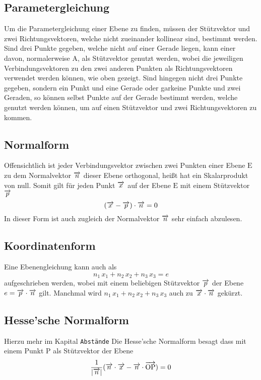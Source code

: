 \documentclass{article}
\begin{document}
\subsection{Parametergleichung}
Um die Parametergleichung einer Ebene zu finden, müssen der Stützvektor und zwei Richtungsvektoren, welche nicht zueinander kollinear sind, bestimmt werden. Sind drei Punkte gegeben, welche nicht auf einer Gerade liegen, kann einer davon, normalerweise $\mathrm{A}$, als Stützvektor genutzt werden, wobei die jeweiligen Verbindungsvektoren zu den zwei anderen Punkten als Richtungsvektoren verwendet werden können, wie oben gezeigt. \newline
Sind hingegen nicht drei Punkte gegeben, sondern ein Punkt und eine Gerade oder garkeine Punkte und zwei Geraden, so können selbst Punkte auf der Gerade bestimmt werden, welche genutzt werden können, um auf einen Stützvektor und zwei Richtungsvektoren zu kommen.
 
\subsection{Normalform}
Offensichtlich ist jeder Verbindungsvektor zwischen zwei Punkten einer Ebene $\mathrm{E}$ zu dem Normalvektor $\overrightarrow{n}$ dieser Ebene orthogonal, heißt hat ein Skalarprodukt von null. Somit gilt für jeden Punkt $\overrightarrow{x}$ auf der Ebene $\mathrm{E}$ mit einem Stützvektor $\overrightarrow{p}$
\[
 (\overrightarrow{x} - \overrightarrow{p}) \cdot \overrightarrow{n} = 0 
\]
In dieser Form ist auch zugleich der Normalvektor $\overrightarrow{n}$ sehr einfach abzulesen. 
 
\subsection{Koordinatenform}
Eine Ebenengleichung kann auch als
\[
 n_1 \, x_1 + n_2 \, x_2 + n_3 \, x_3 = e 
\]
aufgeschrieben werden, wobei mit einem beliebigen Stützvektor $\overrightarrow{p}$ der Ebene $e = \overrightarrow{p} \cdot \overrightarrow{n}$ gilt. Manchmal wird $n_1 \, x_1 + n_2 \, x_2 + n_3 \, x_3$ auch zu $\overrightarrow{x} \cdot \overrightarrow{n}$ gekürzt.
 
\subsection{Hesse'sche Normalform}
Hierzu mehr im Kapital \texttt{Abstände} \newline %
Die Hesse'sche Normalform besagt dass mit einem Punkt $\mathrm{P}$ als Stützvektor der Ebene
\[
 \frac{1}{|\overrightarrow{n}|} (\overrightarrow{n} \cdot \overrightarrow{x} - \overrightarrow{n} \cdot \overrightarrow{\mathrm{OP}}) = 0 
\]
 
\end{document}
